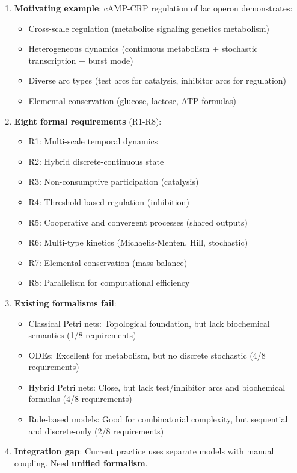 \begin{enumerate}
\def\labelenumi{\arabic{enumi}.}
\tightlist
\item
  \textbf{Motivating example}: cAMP-CRP regulation of lac operon
  demonstrates:

  \begin{itemize}
  \tightlist
  \item
    Cross-scale regulation (metabolite \textrightarrow signaling \textrightarrow genetics \textrightarrow
    metabolism)
  \item
    Heterogeneous dynamics (continuous metabolism + stochastic
    transcription + burst mode)
  \item
    Diverse arc types (test arcs for catalysis, inhibitor arcs for
    regulation)
  \item
    Elemental conservation (glucose, lactose, ATP formulas)
  \end{itemize}
\item
  \textbf{Eight formal requirements} (R1-R8):

  \begin{itemize}
  \tightlist
  \item
    R1: Multi-scale temporal dynamics
  \item
    R2: Hybrid discrete-continuous state
  \item
    R3: Non-consumptive participation (catalysis)
  \item
    R4: Threshold-based regulation (inhibition)
  \item
    R5: Cooperative and convergent processes (shared outputs)
  \item
    R6: Multi-type kinetics (Michaelis-Menten, Hill, stochastic)
  \item
    R7: Elemental conservation (mass balance)
  \item
    R8: Parallelism for computational efficiency
  \end{itemize}
\item
  \textbf{Existing formalisms fail}:

  \begin{itemize}
  \tightlist
  \item
    Classical Petri nets: Topological foundation, but lack biochemical
    semantics (1/8 requirements)
  \item
    ODEs: Excellent for metabolism, but no discrete stochastic (4/8
    requirements)
  \item
    Hybrid Petri nets: Close, but lack test/inhibitor arcs and
    biochemical formulas (4/8 requirements)
  \item
    Rule-based models: Good for combinatorial complexity, but sequential
    and discrete-only (2/8 requirements)
  \end{itemize}
\item
  \textbf{Integration gap}: Current practice uses separate models with
  manual coupling. Need \textbf{unified formalism}.
\end{enumerate}

